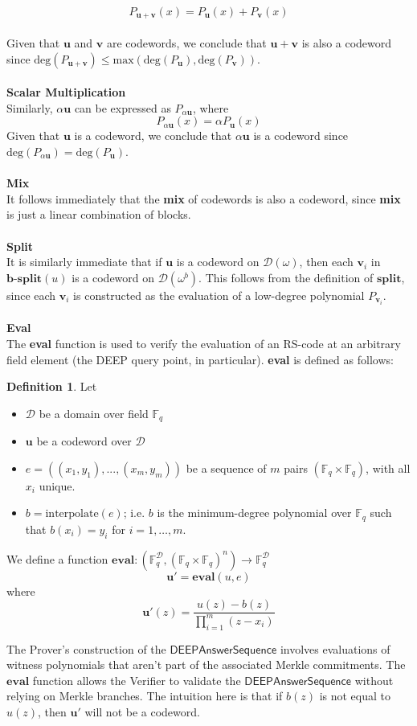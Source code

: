 \documentclass[10pt,letterpaper,titlepage]{article}
\newcommand{\GF}[1]{\mathbb{F}_{#1}}
\newcommand{\w}[0]{\omega}
\newcommand{\D}[0]{\mathcal{D}}
\theoremstyle{definition}
\newtheorem{definition}{Definition}
\begin{document}
\begin{appendices}
\[P_{\mathbf{u}+\mathbf{v}}(x)=P_\mathbf{u}(x)+P_\mathbf{v}(x)\]
\\
Given that $\mathbf{u}$ and $\mathbf{v}$ are codewords, we conclude that $\mathbf{u}+\mathbf{v}$ is also a codeword since $\text{deg}(P_{\mathbf{u}+\mathbf{v}})\leq\text{max}\left(\text{deg}(P_\mathbf{u}),\text{deg}(P_\mathbf{v})\right)$.\\
\\
\textbf{Scalar Multiplication}\\
Similarly, $\alpha \mathbf{u}$ can be expressed as $P_{\alpha \mathbf{u}}$, where 
\[P_{\alpha \mathbf{u}}(x)=\alpha P_\mathbf{u}(x)\]
Given that $\mathbf{u}$ is a codeword, we conclude that $\alpha \mathbf{u}$ is a codeword since $\text{deg}(P_{\alpha \mathbf{u}})=\text{deg}(P_\mathbf{u})$. \\
\\
\textbf{Mix}\\
It follows immediately that the \textbf{mix} of codewords is also a codeword, since \textbf{mix} is just a linear combination of blocks.\\
\\
\textbf{Split}\\
It is similarly immediate that if $\mathbf{u}$ is a codeword on $\D(\w)$, then each $\mathbf{v}_i$ in $\textbf{b-split}(u)$ is a codeword on $\D(\w^b)$. 
This follows from the definition of $\textbf{split}$, since each $\mathbf{v}_i$ is constructed as the evaluation of a low-degree polynomial $P_{\mathbf{v}_i}$.\\
\\
\textbf{Eval}\\
The \textbf{eval} function is used to verify the evaluation of an RS-code at an arbitrary field element (the DEEP query point, in particular). \textbf{eval} is defined as follows:
\begin{definition}
  \label{def-eval}
  Let \begin{itemize}
    \item $\D$ be a domain over field $\GF{q}$
    \item $\mathbf{u}$ be a codeword over $\D$
    \item $e =((x_1, y_1), ..., (x_m, y_m))$ be a sequence of $m$ pairs $(\GF{q} \times \GF{q})$, with all $x_i$ unique.
    \item $b=\textrm{interpolate}(e)$; i.e. $b$ is the minimum-degree polynomial over $\GF{q}$ such that $b(x_i)=y_i$ for $i=1,\ldots,m$.
  \end{itemize}
  We define a function $\textbf{eval} : (\GF{q}^{\D}, (\GF{q} \times \GF{q})^n) \rightarrow \GF{q}^{\D}$
  \[
    \mathbf{u'} = \textbf{eval}(u, e)
  \]
  where
  \[
    \mathbf{u'}(z) = \frac{u(z) - b(z)}{\prod_{i=1}^{m} (z - x_i)}
  \]
\end{definition}
\noindent
The Prover's construction of the $\mathsf{DEEPAnswerSequence}$ involves evaluations of witness polynomials that aren't part of the associated Merkle commitments. 
The $\textbf{eval}$ function allows the Verifier to validate the $\mathsf{DEEPAnswerSequence}$ without relying on Merkle branches. 
The intuition here is that if $b(z)$ is not equal to $u(z)$, then $\mathbf{u}'$ will not be a codeword.

\end{appendices}
\end{document}
